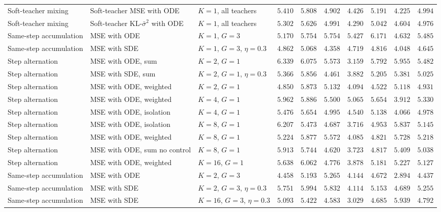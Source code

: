 \begin{table}[H]
{\begin{tabular}{lll|ccccccc}
    \midrule
    Soft-teacher mixing & Soft-teacher MSE with ODE & $K{=}1$, all teachers & $5.410$ & $5.808$ & $4.902$ & $4.426$ & $5.191$ & $4.225$ & $4.994$\\
    Soft-teacher mixing & Soft-teacher KL-$\bar{\sigma}^2$ with ODE & $K{=}1$, all teachers & $5.302$ & $5.626$ & $4.991$ & $4.290$ & $5.042$ & $4.604$ & $4.976$\\
    \midrule
    Same-step accumulation & MSE with ODE & $K{=}1$, $G{=}3$ & $5.170$ & $5.754$ & $5.754$ & $5.427$ & $6.171$ & $4.632$ & $5.485$\\
    Same-step accumulation & MSE with SDE & $K{=}1$, $G{=}3$, $\eta{=}0.3$ & $4.862$ & $5.068$ & $4.358$ & $4.719$ & $4.816$ & $4.048$ & $4.645$\\
    \midrule
    Step alternation & MSE with ODE, sum & $K{=}2$, $G{=}1$ & $6.339$ & $6.075$ & $5.573$ & $3.159$ & $5.792$ & $5.955$ & $5.482$\\
    Step alternation & MSE with SDE, sum & $K{=}2$, $G{=}1$, $\eta{=}0.3$ & $5.366$ & $5.856$ & $4.461$ & $3.882$ & $5.205$ & $5.381$ & $5.025$\\
    Step alternation & MSE with ODE, weighted & $K{=}2$, $G{=}1$ & $4.850$ & $5.873$ & $5.132$ & $4.094$ & $4.522$ & $5.118$ & $4.931$\\
    Step alternation & MSE with ODE, weighted & $K{=}4$, $G{=}1$ & $5.962$ & $5.886$ & $5.500$ & $5.065$ & $5.654$ & $3.912$ & $5.330$\\
    Step alternation & MSE with ODE, isolation & $K{=}4$, $G{=}1$ & $5.476$ & $5.654$ & $4.995$ & $4.540$ & $5.138$ & $4.066$ & $4.978$\\
    Step alternation & MSE with ODE, isolation & $K{=}8$, $G{=}1$ & $6.207$ & $5.473$ & $4.687$ & $3.716$ & $4.953$ & $5.837$ & $5.145$\\
    Step alternation & MSE with ODE, weighted & $K{=}8$, $G{=}1$ & $5.224$ & $5.877$ & $5.572$ & $4.085$ & $4.821$ & $5.728$ & $5.218$\\
    Step alternation & MSE with ODE, sum no control & $K{=}8$, $G{=}1$ & $5.913$ & $5.744$ & $4.620$ & $3.723$ & $4.817$ & $5.409$ & $5.038$\\
    Step alternation & MSE with ODE, weighted & $K{=}16$, $G{=}1$ & $5.638$ & $6.062$ & $4.776$ & $3.878$ & $5.181$ & $5.227$ & $5.127$\\
    \midrule
    Same-step accumulation & MSE with ODE & $K{=}2$, $G{=}3$ & $4.458$ & $5.193$ & $5.265$ & $4.144$ & $4.672$ & $2.894$ & $4.437$\\
    Same-step accumulation & MSE with SDE & $K{=}2$, $G{=}3$, $\eta{=}0.3$ & $5.751$ & $5.994$ & $5.832$ & $4.114$ & $5.153$ & $4.689$ & $5.255$\\
    Same-step accumulation & MSE with SDE & $K{=}16$, $G{=}3$, $\eta{=}0.3$ & $5.093$ & $5.422$ & $4.583$ & $3.029$ & $4.685$ & $5.939$ & $4.792$\\
    \bottomrule
  \end{tabular}%
  }
\end{table}
